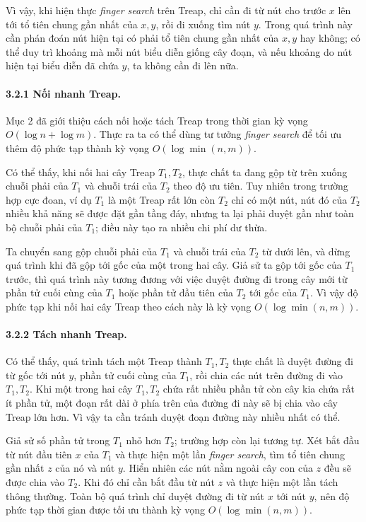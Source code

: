 \documentclass[11pt]{article}
\begin{document}
Vì vậy, khi hiện thực \emph{finger search} trên Treap, chỉ cần đi từ nút cho
trước \(x\) lên tới tổ tiên chung gần nhất của \(x,y\), rồi đi xuống tìm nút
\(y\). Trong quá trình này cần phán đoán nút hiện tại có phải tổ tiên chung gần
nhất của \(x,y\) hay không; có thể duy trì khoảng mà mỗi nút biểu diễn giống
cây đoạn, và nếu khoảng do nút hiện tại biểu diễn đã chứa \(y\), ta không cần
đi lên nữa.

\paragraph{3.2.1 Nối nhanh Treap.}
Mục 2 đã giới thiệu cách nối hoặc tách Treap trong thời gian kỳ vọng
\(O(\log n+\log m)\). Thực ra ta có thể dùng tư tưởng \emph{finger search} để
tối ưu thêm độ phức tạp thành kỳ vọng \(O(\log\min(n,m))\).

Có thể thấy, khi nối hai cây Treap \(T_1,T_2\), thực chất ta đang gộp từ trên
xuống chuỗi phải của \(T_1\) và chuỗi trái của \(T_2\) theo độ ưu tiên. Tuy
nhiên trong trường hợp cực đoan, ví dụ \(T_1\) là một Treap rất lớn còn \(T_2\)
chỉ có một nút, nút đó của \(T_2\) nhiều khả năng sẽ được đặt gần tầng đáy,
nhưng ta lại phải duyệt gần như toàn bộ chuỗi phải của \(T_1\); điều này tạo ra
nhiều chi phí dư thừa.

Ta chuyển sang gộp chuỗi phải của \(T_1\) và chuỗi trái của \(T_2\) từ dưới lên,
và dừng quá trình khi đã gộp tới gốc của một trong hai cây. Giả sử ta gộp tới
gốc của \(T_1\) trước, thì quá trình này tương đương với việc duyệt đường đi
trong cây mới từ phần tử cuối cùng của \(T_1\) hoặc phần tử đầu tiên của \(T_2\)
tới gốc của \(T_1\). Vì vậy độ phức tạp khi nối hai cây Treap theo cách này là
kỳ vọng \(O(\log\min(n,m))\).

\paragraph{3.2.2 Tách nhanh Treap.}
Có thể thấy, quá trình tách một Treap thành \(T_1,T_2\) thực chất là duyệt
đường đi từ gốc tới nút \(y\), phần tử cuối cùng của \(T_1\), rồi chia các nút
trên đường đi vào \(T_1,T_2\). Khi một trong hai cây \(T_1,T_2\) chứa rất nhiều
phần tử còn cây kia chứa rất ít phần tử, một đoạn rất dài ở phía trên của đường
đi này sẽ bị chia vào cây Treap lớn hơn. Vì vậy ta cần tránh duyệt đoạn đường
này nhiều nhất có thể.

Giả sử số phần tử trong \(T_1\) nhỏ hơn \(T_2\); trường hợp còn lại tương tự.
Xét bắt đầu từ nút đầu tiên \(x\) của \(T_1\) và thực hiện một lần \emph{finger
search}, tìm tổ tiên chung gần nhất \(z\) của nó và nút \(y\). Hiển nhiên các
nút nằm ngoài cây con của \(z\) đều sẽ được chia vào \(T_2\). Khi đó chỉ cần
bắt đầu từ nút \(z\) và thực hiện một lần tách thông thường. Toàn bộ quá trình
chỉ duyệt đường đi từ nút \(x\) tới nút \(y\), nên độ phức tạp thời gian được
tối ưu thành kỳ vọng \(O(\log\min(n,m))\).
\end{document}
